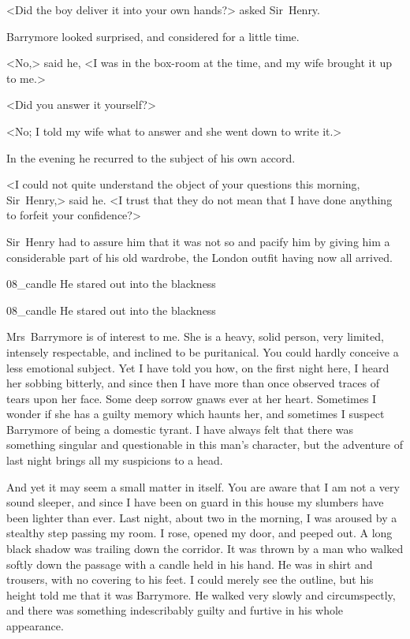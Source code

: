<Did the boy deliver it into your own hands?> asked Sir~Henry.

Barrymore looked surprised, and considered for a little time.

<No,> said he, <I was in the box-room at the time, and my wife brought it up to me.>

<Did you answer it yourself?>

<No; I told my wife what to answer and she went down to write it.>

In the evening he recurred to the subject of his own accord.

<I could not quite understand the object of your questions this morning, Sir~Henry,> said he. <I trust that they do not mean that I have done anything to forfeit your confidence?>

Sir~Henry had to assure him that it was not so and pacify him by giving him a considerable part of his old wardrobe, the London outfit having now all arrived.


\begin{letter}
	\begin{bwbigpic}
		[1.0] 
		{08_candle}
		{He stared out into the blackness}
	\end{bwbigpic}
\end{letter}
\begin{a4}
	\begin{bwbigpic}
		[0.9] 
		{08_candle}
		{He stared out into the blackness}
	\end{bwbigpic}
\end{a4}


Mrs~Barrymore is of interest to me. She is a heavy, solid person, very limited, intensely respectable, and inclined to be puritanical. You could hardly conceive a less emotional subject. Yet I have told you how, on the first night here, I heard her sobbing bitterly, and since then I have more than once observed traces of tears upon her face. Some deep sorrow gnaws ever at her heart. Sometimes I wonder if she has a guilty memory which haunts her, and sometimes I suspect Barrymore of being a domestic tyrant. I have always felt that there was something singular and questionable in this man's character, but the adventure of last night brings all my suspicions to a head.

And yet it may seem a small matter in itself. You are aware that I am not a very sound sleeper, and since I have been on guard in this house my slumbers have been light\-er than ever. Last night, about two in the morning, I was aroused by a stealthy step pass\-ing my room. I rose, opened my door, and peeped out. A long black sha\-dow was trailing down the corridor. It was thrown by a man who walked softly down the passage with a candle held in his hand. He was in shirt and trousers, with no covering to his feet. I could merely see the outline, but his height told me that it was Barrymore. He walked very slowly and circumspectly, and there was something indescribably guilty and furtive in his whole appearance.

